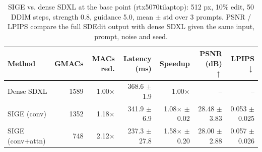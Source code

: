 \begin{table}[t]
\centering
\small
\caption{SIGE vs. dense SDXL at the base point (rtx5070tilaptop): 512 px, 10\% edit, 50 DDIM steps, strength 0.8, guidance 5.0, mean $\pm$ std over 3 prompts. PSNR / LPIPS compare the full SDEdit output with dense SDXL given the same input, prompt, noise and seed.}
\label{tab:baseline_rtx5070tilaptop}
\begin{tabular}{lrrrrrr}
\toprule
Method & GMACs & MACs red. & Latency (ms) & Speedup & PSNR (dB) $\uparrow$ & LPIPS $\downarrow$ \\
\midrule
Dense SDXL & 1589 & 1.00$\times$ & 368.6 $\pm$ 1.9 & 1.00$\times$ & -- & -- \\
SIGE (conv) & 1352 & 1.18$\times$ & 341.9 $\pm$ 6.9 & 1.08$\times$ $\pm$ 0.02 & 28.48 $\pm$ 3.83 & 0.053 $\pm$ 0.025 \\
SIGE (conv+attn) & 748 & 2.12$\times$ & 237.3 $\pm$ 27.8 & 1.58$\times$ $\pm$ 0.20 & 28.00 $\pm$ 2.88 & 0.057 $\pm$ 0.026 \\
\bottomrule
\end{tabular}
\end{table}

